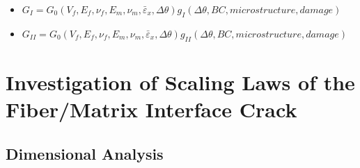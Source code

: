 \documentclass[first,firstsupp,lastsupp,last,hyperref,table]{ETHclass}
\begin{document}
\begin{frame}
\begin{columns}[c]
\begin{column}{0.5\textwidth}
\begin{figure}
\end{figure}
\end{column}
\end{columns}
\centering
\begin{itemize}[label=(?)]
\centering
\footnotesize
\item $G_{I}=G_{0}\left(V_{f},E_{f},\nu_{f},E_{m},\nu_{m},\bar{\varepsilon}_{x},\Delta\theta\right)g_{I}\left(\Delta\theta,BC,microstructure,damage\right)$
\item $G_{II}=G_{0}\left(V_{f},E_{f},\nu_{f},E_{m},\nu_{m},\bar{\varepsilon}_{x},\Delta\theta\right)g_{II}\left(\Delta\theta,BC,microstructure,damage\right)$
\end{itemize}
\end{frame}

\section[Investigation of Scaling Laws]{Investigation of Scaling Laws of the Fiber/Matrix Interface Crack}

\subsection{Dimensional Analysis}
\end{document}
